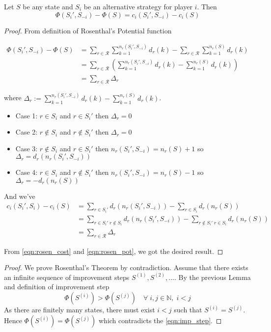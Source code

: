 \begin{lemma}
Let $S$ be any state and $S_i$ be an alternative strategy for player $i$.
Then
$$\Phi(S_i',S_{-i}) - \Phi(S) = c_i(S_i',S_{-i})-c_i(S)$$
\end{lemma}
\begin{proof}
From definition of Rosenthal's Potential function

\begin{align}
\Phi(S_i',S_{-i}) - \Phi(S) &= \sum_{r\in\mathcal{R}}\sum_{k=1}^{n_r(S_i',S_{-i})}d_r(k) -\sum_{r\in\mathcal{R}}\sum_{k=1}^{n_r(S)}d_r(k) \nonumber \\
  &= \sum_{r\in\mathcal{R}} \left( \sum_{k=1}^{n_r(S_i',S_{-i})}d_r(k) - \sum_{k=1}^{n_r(S)} d_r(k) \right) \nonumber \\
  &= \sum_{r\in\mathcal{R}} \Delta_r \label{eqn:rosen_pot}
\end{align}

 where $\Delta_r := \sum_{k=1}^{n_r(S_i',S_{-i})}d_r(k) - \sum_{k=1}^{n_r(S)} d_r(k)$.
 \begin{itemize}
     \item Case 1: $r\in S_i$ and $r \in S_i'$ then $\Delta_r = 0$
     \item Case 2: $r\notin S_i$ and $r \notin S_i'$ then $\Delta_r = 0$
     \item Case 3: $r\notin S_i$ and $r \in S_i'$ then
     $n_r(S_i',S_{-i})=n_r(S)+1$ so $\Delta_r=d_r(n_r(S_i',S_{-i}))$
     \item Case 4: $r\in S_i$ and $r\notin S_i'$ then 
     $n_r(S_i',S_{-i})=n_r(S)-1$ so $\Delta_r=-d_r(n_r(S))$
 \end{itemize}

And we've
\begin{align}
    c_i(S_i',S_i)-c_i(S) &= \sum_{r\in S_i'}d_r(n_r(S_i',S_{-i})) - \sum_{r\in S_i}d_r(n_r(S)) \nonumber \\
    &= \sum_{r\in S_i' \; r\notin S_i} d_r(n_r(S_i',S_{-i})) - \sum_{r\notin S_i' \; r\in S_i}d_r(n_r(S)) \nonumber \\
    &= \sum_{r\in\mathcal{R}} \Delta_r \label{eqn:rosen_cost}
\end{align}

From \ref{eqn:rosen_cost} and \ref{eqn:rosen_pot}, we got the desired result.

\end{proof}


\begin{proof}
We prove Rosenthal's Theorem by contradiction. Assume that there exists
an infinite sequence of improvement steps $S^{(1)}, S^{(2)},\ldots $.
By the previous Lemma and definition of improvement step
\begin{equation}
\label{eqn:imp_step}
\Phi(S^{(i)}) > \Phi(S^{(j)}) \quad \forall \; i,j\in\mathbb{N}, \; i < j
\end{equation}
As there are finitely many states, there must exist $i<j$ such that
$S^{(i)}=S^{(j)}$. Hence $\Phi(S^{(i)})=\Phi(S^{(j)})$ which contradicts
the \ref{eqn:imp_step}.
\end{proof}


